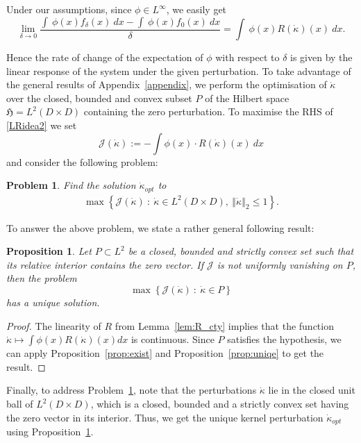 \documentclass{amsart}
\newtheorem{problem}[theorem]{Problem}
\newtheorem{proposition}[theorem]{Proposition}
\newcommand\fH{{\mathfrak H}}
\newcommand{\norm}[1]{\left\Vert#1\right\Vert}
\begin{document}
 Under our assumptions, since $\phi\in L^\infty$, we easily get 
\begin{equation}\label{LRidea2}
\lim_{\delta \rightarrow 0}\frac{\int \ \phi(x)f_\delta (x) \ dx-\int \
\phi(x)f_{0}(x) \ dx}{ \delta }=\int \ \phi(x)R(\dot{\kappa})(x)\ dx.  
\end{equation}

Hence the rate of change of the expectation of $\phi$ with respect to $\delta$ is given by the linear response of the system under the given perturbation. To take advantage of the general results of Appendix~\ref{appendix}, we perform the optimisation of $\dot{\kappa}$ over the closed, bounded and convex subset \(P\) of the Hilbert space $\fH=L^2(D\times D)$ containing the zero perturbation. To maximise the RHS of \eqref{LRidea2} we set 
\[
\mathcal{J}(\dot \kappa):=-\int \phi(x)\cdot R(\dot{\kappa})(x)\ dx
\]
and consider the following problem:
\begin{problem}\label{prob:max}
Find the  solution $\dot{\kappa}_{opt}$ to 
   \begin{eqnarray}  
   \max \left \lbrace  \mathcal{J}(\dot{\kappa}) \ : \  \dot{\kappa} \in L^2 (D\times D), \ \norm{\dot{\kappa}}_2 \leq 1\right \rbrace .
\end{eqnarray} 
\end{problem}

To answer the above problem, we state a rather general following result:

\begin{proposition}\label{prop:gen_cnvx}
Let \(P\subset L^2\) be a closed, bounded and strictly convex set such that its relative interior contains the zero vector. If $\mathcal{J}$ is not uniformly vanishing on \(P\), then the problem 
$$
     \max \left \lbrace \mathcal{J}(\dot{\kappa})\ : \   \dot{\kappa} \in P\right \rbrace 
$$
has a unique solution.
\end{proposition}
\begin{proof}
     The linearity of \(R\) from Lemma~\ref{lem:R_cty} implies that the function \(\dot \kappa\mapsto \int \phi(x)R(\dot \kappa)(x)dx\) is continuous. Since \(P\) satisfies the hypothesis, we can apply Proposition~\ref{prop:exist} and Proposition~\ref{prop:uniqe} to get the result.
\end{proof}

Finally, to address Problem~\ref{prob:max}, note that the perturbations \(\dot \kappa\) lie in the closed unit ball of \(L^2(D\times D)\), which is a closed, bounded and a strictly convex set having the zero vector in its interior. Thus, we get the unique kernel perturbation \(\dot{\kappa}_{opt}\) using Proposition~\ref{prop:gen_cnvx}. 
\end{document}
